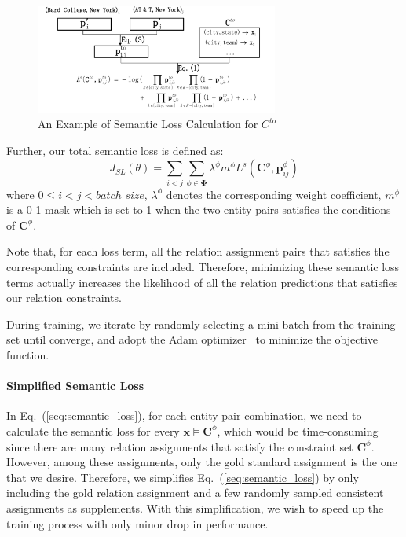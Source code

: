 \begin{figure}
	\centering
	\includegraphics[width=8cm]{./result-figure/example.pdf}
	\vspace{-2em}
	\caption{{\small An Example of Semantic Loss Calculation for $C^{to}$}}
	\label{fig:example}
	\vspace{-1.5em}
\end{figure}


Further, our total semantic loss is defined as:
\begin{equation}
	J_{SL}(\theta) = \sum\limits_{i < j}{\sum_{\phi \in \bm{\Phi}}{\lambda ^{\phi}m^{\phi}L^{s}(\bm{C}^{\phi}, \bm{p}_{ij}^{\phi})}}
\end{equation}
where $0\leq i < j < batch\_size$,
$\lambda^{\phi}$ denotes the corresponding weight coefficient, 
$m^{\phi}$ is a 0-1 mask which is set to 1 when the two entity pairs satisfies the conditions of $\bm{C}^{\phi}$.

Note that, for each loss term, all the relation assignment pairs that satisfies the corresponding constraints are included.
Therefore, minimizing these semantic loss terms actually increases the likelihood of all the relation predictions that satisfies our relation constraints.

During training, we iterate by randomly selecting a mini-batch from the training set until converge, and adopt the Adam optimizer~\cite{kingma2014adam} to minimize the objective function.
\paragraph{Simplified Semantic Loss}
In Eq.~(\ref{seq:semantic_loss}), for each entity pair combination, we need to calculate the semantic loss for every $\bm x \models \bm{C}^{\phi}$, which would be time-consuming since there are many relation assignments that satisfy the constraint set $\bm{C}^{\phi}$.
However, among these assignments, only the gold standard assignment is the one that we desire.
Therefore, we simplifies Eq.~(\ref{seq:semantic_loss}) by only including the gold relation assignment and a few randomly sampled consistent assignments as supplements.
With this simplification, we wish to speed up the training process with only minor drop in performance.


